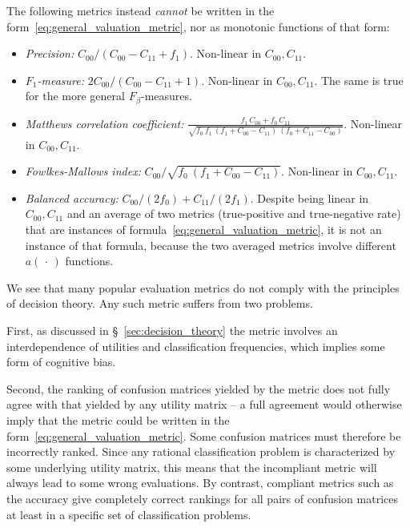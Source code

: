 \documentclass[\ifafour a4paper,12pt,\else a5paper,10pt,\fi%
onecolumn,oneside,article,%
british%
]{memoir}
\theoremstyle{remark}
\theoremstyle{innote}
\newcommand*{\dotv}{\mathord{\,\cdot\,}}%
\renewcommand*{\|}[1][]{\nonscript\:#1\vert\nonscript\:\mathopen{}}
\newcommand*{\sect}{\S}%
\newcommand*{\itemno}{{\fontencoding{U}\fontfamily{pzd}\selectfont\symbol{55}}}
\begin{document}
The following metrics instead \emph{cannot} be written in the form~\eqref{eq:general_valuation_metric}, nor as monotonic functions of that form:
\begin{itemize}
\item[\itemno] \emph{Precision:} $C_{00}/(C_{00}-C_{11}+f_{1})$. Non-linear in $C_{00}, C_{11}$.

\item[\itemno] \emph{$F_{1}$-measure:} $2 C_{00}/(C_{00} - C_{11} + 1)$. Non-linear in $C_{00}, C_{11}$. The same is true for the more general $F_{\beta}$-measures.

\item[\itemno] \emph{Matthews correlation coefficient:} $\frac{
    f_{1}\,C_{00} + f_{0}\,C_{11}}{\sqrt{
      f_{0}\ f_{1}\ (f_{1} + C_{00} - C_{11})\ (f_{0} + C_{11} - C_{00})
    }}$. Non-linear in $C_{00}, C_{11}$.

\item[\itemno] \emph{Fowlkes-Mallows index:} $C_{00}/\sqrt{
      f_{0}\ (f_{1} + C_{00} - C_{11})}$. Non-linear in $C_{00}, C_{11}$.

  \item[\itemno] \emph{Balanced accuracy:} $C_{00}/(2 f_{0}) + C_{11}/(2 f_{1})$. Despite being linear in $C_{00}, C_{11}$ and an average of two metrics (true-positive and true-negative rate) that are instances of formula~\eqref{eq:general_valuation_metric}, it is not an instance of that formula, because the two averaged metrics involve different $a(\dotv)$ functions.
\end{itemize}

We see that many popular evaluation metrics do not comply with the principles of decision theory. Any such metric suffers from two problems.

First, as discussed in \sect~\ref{sec:decision_theory} the metric involves an interdependence of utilities and classification frequencies, which implies some form of cognitive bias\autocites[discuss such biases in regard to the $F_{1}$-measure]{handetal2018}.

Second, the ranking of confusion matrices yielded by the metric does not fully agree with that yielded by any utility matrix -- a full agreement would otherwise imply that the metric could be written in the form~\eqref{eq:general_valuation_metric}. Some confusion matrices must therefore be incorrectly ranked. Since any rational classification problem is characterized by some underlying utility matrix, this means that the incompliant metric will always lead to some wrong evaluations. By contrast, compliant metrics such as the accuracy give completely correct rankings for all pairs of confusion matrices at least in a specific set of classification problems.
\end{document}
